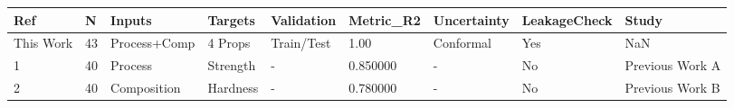 \begin{tabular}{lllllllll}
\toprule
Ref & N & Inputs & Targets & Validation & Metric_R2 & Uncertainty & LeakageCheck & Study \\
\midrule
This Work & 43 & Process+Comp & 4 Props & Train/Test & 1.00 & Conformal & Yes & NaN \\
1 & 40 & Process & Strength & - & 0.850000 & - & No & Previous Work A \\
2 & 40 & Composition & Hardness & - & 0.780000 & - & No & Previous Work B \\
\bottomrule
\end{tabular}

